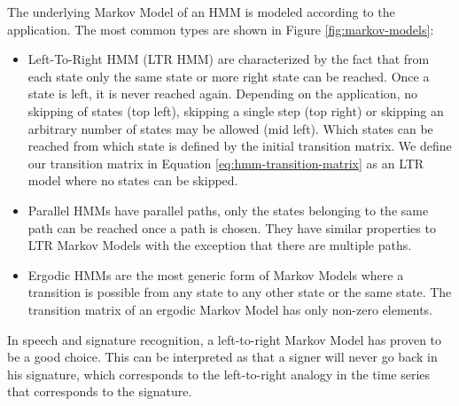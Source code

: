 \documentclass[a4paper, oneside]{csthesis}
\begin{document}
The underlying Markov Model of an HMM is modeled according to the application. The most common types are shown in Figure \ref{fig:markov-models}:
\begin{itemize}
\item Left-To-Right HMM (LTR HMM) are characterized by the fact that from each state only the same state or more right state can be reached. Once a state is left, it is never reached again. Depending on the application, no skipping of states (top left), skipping a single step (top right) or skipping an arbitrary number of states may be allowed (mid left). Which states can be reached from which state is defined by the initial transition matrix. We define our transition matrix in Equation \ref{eq:hmm-transition-matrix} as an LTR model where no states can be skipped.
\item Parallel HMMs have parallel paths, only the states belonging to the same path can be reached once a path is chosen. They have similar properties to LTR Markov Models with the exception that there are multiple paths.
\item Ergodic HMMs are the most generic form of Markov Models where a transition is possible from any state to any other state or the same state. The transition matrix of an ergodic Markov Model has only non-zero elements.
\end{itemize}

In speech and signature recognition, a left-to-right Markov Model has proven to be a good choice. This can be interpreted as that a signer will never go back in his signature, which corresponds to the left-to-right analogy in the time series that corresponds to the signature.
\end{document}
